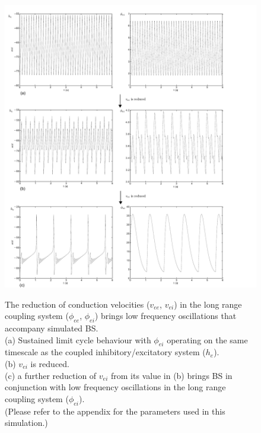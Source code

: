 \documentclass[a4paper,12pt]{article}
\begin{document}
\begin{figure}
	\includegraphics[scale=0.75]{frontiers-2012-working-images/figure-4-phi.pdf}
	\label{fig:phi_dyn}
	\caption{The reduction of conduction velocities ($v_{ee}$, $v_{ei}$) in the long range coupling system ($\phi_{ee}$, $\phi_{ei}$) brings low frequency oscillations that accompany simulated BS. \\
	(a) Sustained limit cycle behaviour with $\phi_{ei}$ operating on the same timescale as the coupled inhibitory/excitatory system ($h_e$).\\
           (b) $v_{ei}$ is reduced.\\
 (c) a further reduction of $v_{ei}$ from its value in (b) brings BS in conjunction with low frequency oscillations in the long range coupling system ($\phi_{ei}$).\\
(Please refer to the appendix for the parameters used in this simulation.)}
\end{figure}
\end{document}
